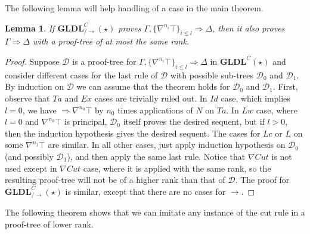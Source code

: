 \documentclass[12pt,a4paper]{article}
\theoremstyle{plain}
\newtheorem{lem}[thm]{Lemma}
\theoremstyle{definition}
\begin{document}
The following lemma will help handling of a case in the main theorem.

\begin{lem}\label{lem:ldls-top-redundant} If $\mathbf{GLDL}^C_{/\rightarrow}(\star)$ proves $\Gamma , \{\nabla^{n_i} \top\}_{i \leq l} \Rightarrow \Delta$, then it also proves $\Gamma \Rightarrow \Delta$ with a proof-tree of at most the same rank.
\end{lem}
\begin{proof}
Suppose $\mathcal{D}$ is a proof-tree for $\Gamma , \{\nabla^{n_i} \top\}_{i \leq l} \Rightarrow \Delta$ in $\mathbf{GLDL}^C(\star)$ and consider different cases for the last rule of $\mathcal{D}$ with possible sub-trees $\mathcal{D}_0$ and $\mathcal{D}_1$.
By induction on $\mathcal{D}$ we can assume that the theorem holds for $\mathcal{D}_0$ and $\mathcal{D}_1$.
First, observe that $Ta$ and $Ex$ cases are trivially ruled out. In $Id$ case, which implies $l = 0$, we have $\Rightarrow \nabla^{n_0} \top$ by $n_0$ times applications of $N$ on $Ta$. In $Lw$ case, where $l = 0$ and $\nabla^{n_0} \top$ is principal, $\mathcal{D}_0$ itself proves the desired sequent, but if $l > 0$, then the induction hypothesis gives the desired sequent. The cases for $Lc$ or $L$ on some $\nabla^{n_j} \top$  are similar. In all other cases, just apply induction hypothesis on $\mathcal{D}_0$ (and possibly $\mathcal{D}_1$), and then apply the same last rule. Notice that $\nabla Cut$ is not used except in $\nabla Cut$ case, where it is applied with the same rank, so the resulting proof-tree will not be of a higher rank than that of $\mathcal{D}$.
The proof for $\mathbf{GLDL}^C_{/\rightarrow}(\star)$ is similar, except that there are no cases for $\rightarrow$.
\end{proof}

The following theorem shows that we can imitate any instance of the cut rule in a proof-tree of lower rank.
\end{document}
